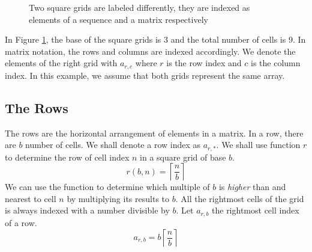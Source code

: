 \documentclass[letterpaper, twoside,12pt]{article}
\begin{document}
    \begin{figure}[ht]
        \centering
        \begin{minipage}{0.45\textwidth}
            \centering
        \end{minipage}
        \begin{minipage}{0.45\textwidth}
            \centering
        \end{minipage}

        \caption{Two square grids are labeled differently, they are indexed as elements of a sequence and a matrix respectively} \label{2forms1grid}
    \end{figure}

    In Figure \ref{2forms1grid}, the base of the square grids is 3 and the total number of cells is 9. In matrix notation, the rows and columns are indexed accordingly. We denote the elements of the right grid with $a_{r,c}$ where $r$ is the row index and $c$ is the column index. In this example, we assume that both grids represent the same array.

    \subsection{The Rows} \label{rows}
    The rows are the horizontal arrangement of elements in a matrix. In a row, there are $b$ number of cells. We shall denote a row index as $a_{r,*}$. We shall use function $r$ to determine the row of cell index $n$ in a square grid of base $b$.
    \begin{equation}
        r(b,n) = \left\lceil \frac{n}{b} \right\rceil
    \end{equation}
    We can use the function to determine which multiple of $b$ is \emph{higher} than and nearest to cell $n$ by multiplying its results to $b$. All the rightmost cells of the grid is always indexed with a number divisible by $b$. Let $a_{r,b}$ the rightmost cell index of a row.
    \begin{equation}
        a_{r,b} = b\left\lceil \frac{n}{b} \right\rceil
    \end{equation}
\end{document}
